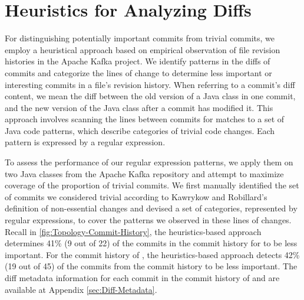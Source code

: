 \section{Heuristics for Analyzing Diffs}
\label{sec:Heuristics}

For distinguishing potentially important commits from trivial commits, 
we employ a heuristical approach based on empirical observation of file revision histories in the Apache Kafka project.
We identify patterns in the diffs of commits and categorize the lines of change to determine less important or interesting commits in a file's revision history.
When referring to a commit's diff content, we mean the diff between the old version of a Java class in one commit, 
and the new version of the Java class after a commit has modified it.
This approach involves scanning the lines between commits for matches to a set of Java code patterns, 
which describe categories of trivial code changes.
Each pattern is expressed by a regular expression.

To assess the performance of our regular expression patterns, 
we apply them on two Java classes from the Apache Kafka repository and attempt to maximize coverage of the proportion of trivial commits.
We first manually identified the set of commits we considered trivial according to Kawrykow and Robillard's definition of non-essential changes \cite{kawrykow_non-essential_2011} and devised a set of categories, represented by regular expressions, to cover the patterns we observed in these lines of changes.
Recall in \autoref{fig:Topology-Commit-History}, the heuristics-based approach determines 41\% (9 out of 22) of the commits in the commit history for  to be less important.
For the commit history of , the heuristics-based approach detects 42\% (19 out of 45) of the commits from the commit history to be less important.
The diff metadata information for each commit in the commit history of  
and  are available at Appendix \ref{sec:Diff-Metadata}.


